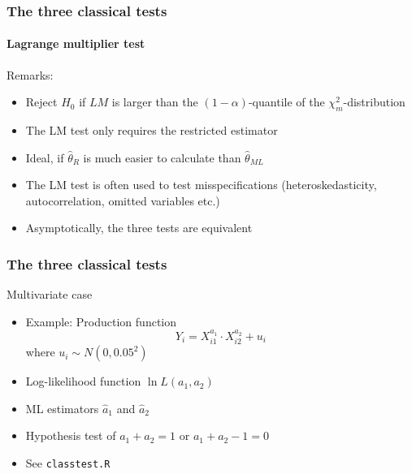 \documentclass[notes=show]{beamer}
\begin{document}
\begin{frame}\frametitle{The three classical tests}\framesubtitle{Lagrange multiplier test}
Remarks:
\begin{itemize}
    \item Reject $H_{0}$ if $LM$ is larger than the $\left( 1-\alpha \right) $-quantile of the $\chi _{m}^{2}$-distribution
    \item The LM test only requires the restricted estimator
    \item Ideal, if $\hat{\theta}_{R}$ is much easier to calculate than $\hat{\theta}_{ML}$
    \item The LM test is often used to test misspecifications\newline
    (heteroskedasticity, autocorrelation, omitted variables etc.)
    \item Asymptotically, the three tests are equivalent
\end{itemize}
\end{frame}


\begin{frame}\frametitle{The three classical tests}
Multivariate case
\begin{itemize}
    \item Example: Production function
    \begin{equation*}
        Y_{i}=X_{i1}^{a_{1}}\cdot X_{i2}^{a_{2}}+u_{i}
    \end{equation*}%
    where $u_{i}\sim N(0,0.05^{2})$
    \item Log-likelihood function $\ln L(a_{1},a_{2})$
    \item ML estimators $\hat{a}_{1}$ and $\hat{a}_{2}$
    \item Hypothesis test of $a_{1}+a_{2}=1$ or $a_{1}+a_{2}-1=0$
    \item See \texttt{classtest.R}
\end{itemize}
\end{frame}
\end{document}
